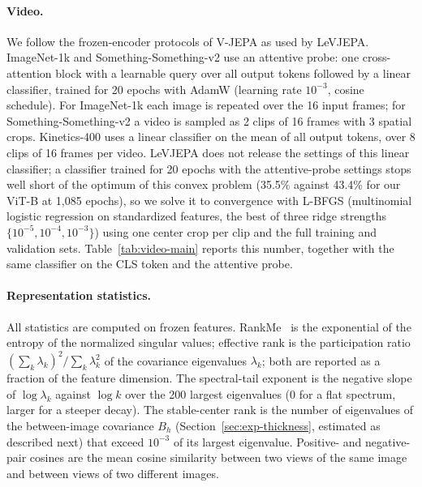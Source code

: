 \documentclass{article} %
\theoremstyle{remark}
\begin{document}
\paragraph{Video.}
We follow the frozen-encoder protocols of V-JEPA as used by LeVJEPA. ImageNet-1k and Something-Something-v2 use an attentive probe: one cross-attention block with a learnable query over all output tokens followed by a linear classifier, trained for 20 epochs with AdamW (learning rate $10^{-3}$, cosine schedule). For ImageNet-1k each image is repeated over the 16 input frames; for Something-Something-v2 a video is sampled as 2 clips of 16 frames with 3 spatial crops. Kinetics-400 uses a linear classifier on the mean of all output tokens, over 8 clips of 16 frames per video. LeVJEPA does not release the settings of this linear classifier; a classifier trained for 20 epochs with the attentive-probe settings stops well short of the optimum of this convex problem (35.5\% against 43.4\% for our ViT-B at 1{,}085 epochs), so we solve it to convergence with L-BFGS (multinomial logistic regression on standardized features, the best of three ridge strengths $\{10^{-5},10^{-4},10^{-3}\}$) using one center crop per clip and the full training and validation sets. Table~\ref{tab:video-main} reports this number, together with the same classifier on the CLS token and the attentive probe.

\paragraph{Representation statistics.}
All statistics are computed on frozen features. RankMe~\citep{rankme2023} is the exponential of the entropy of the normalized singular values; effective rank is the participation ratio $(\sum_k\lambda_k)^2/\sum_k\lambda_k^2$ of the covariance eigenvalues $\lambda_k$; both are reported as a fraction of the feature dimension. The spectral-tail exponent is the negative slope of $\log\lambda_k$ against $\log k$ over the 200 largest eigenvalues (0 for a flat spectrum, larger for a steeper decay). The stable-center rank is the number of eigenvalues of the between-image covariance $B_h$ (Section~\ref{sec:exp-thickness}, estimated as described next) that exceed $10^{-3}$ of its largest eigenvalue. Positive- and negative-pair cosines are the mean cosine similarity between two views of the same image and between views of two different images.
\end{document}
